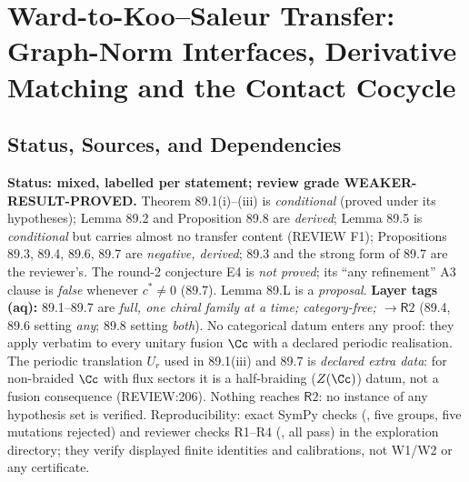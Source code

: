 
\section{Ward-to-Koo--Saleur Transfer: Graph-Norm Interfaces, Derivative Matching and the Contact Cocycle}
\label{sec:ward-ks-transfer}

\subsection{Status, Sources, and Dependencies}

\textbf{Status: mixed, labelled per statement; review grade WEAKER-RESULT-PROVED.}  Theorem 89.1(i)--(iii) is
\emph{conditional} (proved under its hypotheses); Lemma 89.2 and Proposition 89.8 are \emph{derived}; Lemma 89.5 is
\emph{conditional} but carries almost no transfer content (REVIEW F1); Propositions 89.3, 89.4, 89.6, 89.7 are
\emph{negative, derived}; 89.3 and the strong form of 89.7 are the reviewer's.  The round-2 conjecture E4 is
\emph{not proved}; its ``any refinement'' A3 clause is \emph{false} whenever \(c^*\neq0\) (89.7).  Lemma 89.L is a
\emph{proposal}.  \textbf{Layer tags (aq):} 89.1--89.7 are \emph{full, one chiral family at a time; category-free;
\(\to\mathsf R2\)} (89.4, 89.6 setting \emph{any}; 89.8 setting \emph{both}).  No categorical datum enters any proof: they
apply verbatim to every unitary fusion \(\Cc\) with a declared periodic realisation.  The periodic translation
\(U_r\) used in 89.1(iii) and 89.7 is \emph{declared extra data}: for non-braided \(\Cc\) with flux sectors it is a
half-braiding (\(Z(\Cc)\)) datum, not a fusion consequence (REVIEW:206).  Nothing reaches \(\mathsf R2\): no instance
of any hypothesis set is verified.  Reproducibility: exact SymPy checks (, five groups,
five mutations rejected) and reviewer checks R1--R4 (, all pass) in the
exploration directory; they verify displayed finite identities and calibrations, not W1/W2 or any certificate.

